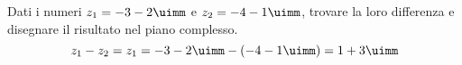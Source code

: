 Dati i numeri $z_1=-3-2\uimm$ e $z_2=-4-1\uimm$, trovare la loro differenza e  disegnare il risultato  nel piano complesso.
\[z_1-z_2=z_1=-3-2\uimm-(-4-1\uimm) =1+3\uimm \]
\begin{center}

\label{fig:disegnopianocomplesso09}
\end{center}
 
